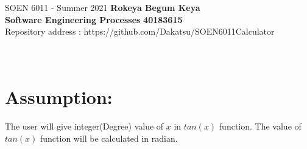 \documentclass[letterpaper, 11pt]{report}
\begin{document}
\newpage
\section*{}
\normalsize {SOEN 6011 - Summer 2021} \hfill \textbf{Rokeya Begum Keya} \\
\textbf{ Software Engineering Processes}  \hfill \textbf{40183615} \\
\hfill Repository address : https://github.com/Dakatsu/SOEN6011Calculator
\\\\\\
\section*{Assumption:} 
The user will give integer(Degree) value of $x$ in $tan(x)$ function. The value of $tan(x)$ function will be calculated in radian.
\\\
\end{document}
